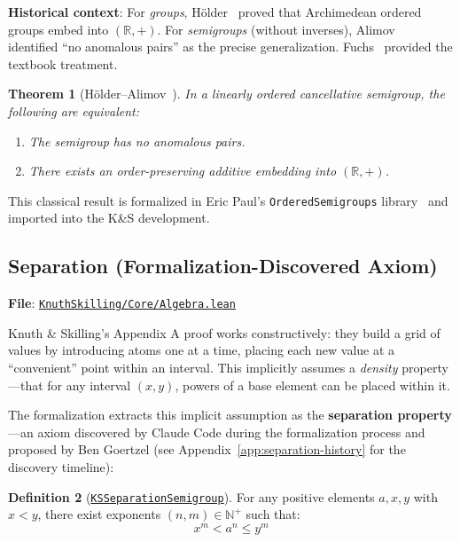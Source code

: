 \documentclass[11pt]{article}
\newtheorem{theorem}{Theorem}[section]
\theoremstyle{definition}
\newtheorem{definition}[theorem]{Definition}
\theoremstyle{remark}
\begin{document}
\textbf{Historical context}: For \emph{groups}, H\"older~\cite{Holder1901} proved that Archimedean ordered groups
embed into $(\mathbb{R}, +)$. For \emph{semigroups} (without inverses), Alimov~\cite{Alimov1950} identified
``no anomalous pairs'' as the precise generalization. Fuchs~\cite{Fuchs1963} provided the textbook treatment.

\begin{theorem}[H\"older--Alimov~\cite{Holder1901,Alimov1950,Fuchs1963}]
\label{thm:holder-alimov}
In a linearly ordered cancellative semigroup, the following are equivalent:
\begin{enumerate}
\item The semigroup has no anomalous pairs.
\item There exists an order-preserving additive embedding into $(\mathbb{R}, +)$.
\end{enumerate}
\end{theorem}

This classical result is formalized in Eric Paul's \texttt{OrderedSemigroups} library~\cite{Paul2024} and imported
into the K\&S development.

\subsection{Separation (Formalization-Discovered Axiom)}
\label{subsec:separation}

\textbf{File}: \href{https://github.com/zariuq/ks-foundations-of-inference/blob/main/KnuthSkilling/Core/Algebra.lean}{\texttt{KnuthSkilling/Core/Algebra.lean}}

Knuth \& Skilling's Appendix A proof works constructively: they build a grid of values by introducing
atoms one at a time, placing each new value at a ``convenient'' point within an interval. This
implicitly assumes a \emph{density} property---that for any interval $(x, y)$, powers of a base
element can be placed within it.

The formalization extracts this implicit assumption as the \textbf{separation property}---an axiom
discovered by Claude Code during the formalization process and proposed by Ben Goertzel
(see Appendix~\ref{app:separation-history} for the discovery timeline):

\begin{definition}[\href{https://github.com/zariuq/ks-foundations-of-inference/blob/main/KnuthSkilling/Core/Algebra.lean}{\texttt{KSSeparationSemigroup}}]
\label{def:separation}
For any positive elements $a, x, y$ with $x < y$, there exist exponents $(n, m) \in \mathbb{N}^+$
such that:
\[
  x^m < a^n \leq y^m
\]
\end{definition}
\end{document}

